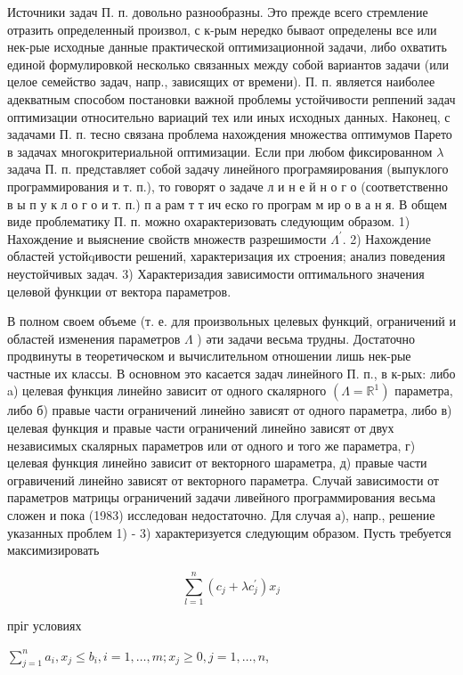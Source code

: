 \documentclass[10pt]{article}
\begin{document}
Источники задач П. п. довольно разнообразны. Это прежде всего стремление отразить определенный произвол, с к-рым нередко бываот определены все или нек-рые исходные данные практической оптимизационной задачи, либо охватить единой формулировкой несколько связанных между собой вариантов задачи (или целое семейство задач, напр., зависящих от времени). П. п. является наиболее адекватным способом постановки важной проблемы устойчивости реппений задач оптимизации относительно вариаций тех или иных исходных данных. Наконец, с задачами П. п. тесно связана проблема нахождения множества оптимумов Парето в задачах многокритериальной оптимизации. Если при любом фиксированном $\lambda$ задача П. п. представляет собой задачу линейного програмяирования (выпуклого программирования и т. п.), то говорят о задаче л и н е й н о г о (соответственно в ы п у к л о г о и т. п.) п а рам т т ич еско го програм м ир о в а н я. В общем виде проблематику П. п. можно охарактеризовать следующим образом. 1) Нахождение и выяснение свойств множеств разрешимости $\Lambda^{\prime}$. 2) Нахождение областей устойqивости решений, характеризация их строения; анализ поведения неустойчивых задач. 3) Характеризадия зависимости оптимального значения целөвой функции от вектора параметров.



В полном своем объеме (т. е. для произвольных целевых функций, ограничений и областей изменения параметров $\Lambda$ ) әти задачи весьма трудны. Достаточно продвинуты в теоретичөском и вычислительном отношении лишь нек-рые частные их классы. В основном это касается задач линейного П. п., в к-рых: либо a) целевая функция линейно зависит от одного скалярного $\left(\Lambda=\mathbb{R}^{1}\right)$ параметра, либо б) правые части ограничений линейно зависят от одного параметра, либо в) целевая функция и правые части ограничений линейно зависят от двух независимых скалярных параметров или от одного и того же параметра, г) целевая функция линейно зависит от векторного шараметра, д) правые части огравичений линейно зависят от векторного параметра. Случай зависимости от параметров матрицы ограничений задачи ливейного программирования весьма сложен и пока (1983) исследован недостаточно. Для случая а), напр., решение указанных проблем 1) - 3) характеризуется следующим образом. Пусть требуется максимизировать



\[

\sum_{l=1}^{n}\left(c_{j}+\lambda c_{j}^{\prime}\right) x_{j}

\]



пріг условиях



$\sum_{j=1}^{n} a_{i}, x_{j} \leqslant b_{i}, i=1, \ldots, m ; x_{j} \geqslant 0, j=1, \ldots, n$,
\end{document}
